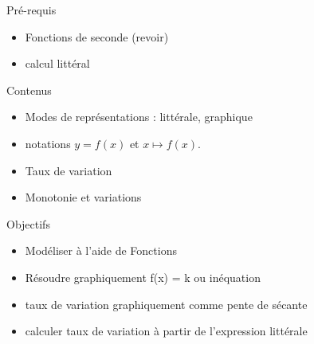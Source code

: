 \documentclass{article}
\theoremstyle{definition}
\begin{document}
\pagestyle{fancy}

\fancyhf{} %
\fancyhead[L]{\large \textbf{\Niveau}}
\fancyhead[C]{\large \textbf{\Chapitre}}

\large

\begin{paragraph}{Pré-requis}
  \begin{itemize}
    \item Fonctions de seconde (revoir)
    \item calcul littéral
  \end{itemize}
\end{paragraph}

\begin{paragraph}{Contenus}
  \begin{itemize}
    \item Modes de représentations : littérale, graphique
    \item notations $y = f(x)$ et $x \mapsto f(x)$.
    \item Taux de variation
    \item Monotonie et variations
  \end{itemize}
\end{paragraph}

\begin{paragraph}{Objectifs}
  \begin{itemize}
    \item Modéliser à l'aide de Fonctions
    \item Résoudre graphiquement f(x) = k ou inéquation
    \item taux de variation graphiquement comme pente de sécante
    \item calculer taux de variation à partir de l'expression littérale
  \end{itemize} 
\end{paragraph}
\end{document}
